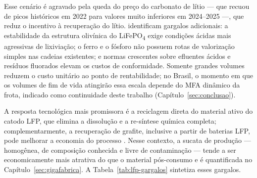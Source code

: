 Esse cenário é agravado pela queda do preço do carbonato de lítio — que recuou de
picos históricos em 2022 para valores muito inferiores em 2024--2025 —, que reduz o
incentivo à recuperação do lítio.  identificam gargalos
adicionais: a estabilidade da estrutura olivínica do LiFePO\textsubscript{4} exige
condições ácidas mais agressivas de lixiviação; o ferro e o fósforo não possuem
rotas de valorização simples nas cadeias existentes; e normas crescentes sobre
efluentes ácidos e resíduos fluorados elevam os custos de conformidade. Somente
grandes volumes reduzem o custo unitário ao ponto de rentabilidade; no Brasil, o
momento em que os volumes de fim de vida atingirão essa escala depende do MFA
dinâmico da frota, indicado como continuidade deste trabalho
(Capítulo~\ref{sec:conclusao}).

A resposta tecnológica mais promissora é a reciclagem direta do material ativo
do catodo LFP, que elimina a dissolução e a re-síntese química completa;
complementarmente, a recuperação de grafite, inclusive a partir de baterias LFP,
pode melhorar a economia do processo \cite{nrel2023}. Nesse contexto, a sucata de
produção — homogênea, de composição conhecida e livre de contaminação — tende a
ser economicamente mais atrativa do que o material pós-consumo e é quantificada
no Capítulo~\ref{sec:gigafabrica}. A Tabela~\ref{tab:lfp-gargalos} sintetiza
esses gargalos.

